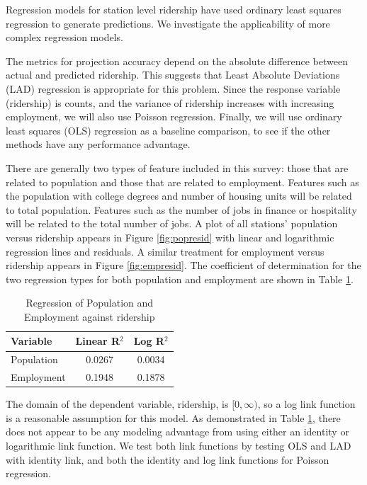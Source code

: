 \documentclass[11pt]{article}
\begin{document}
Regression models for station level ridership have used ordinary least squares regression \cite{Kuby2004, Taylor2008, Currie2011, Durning2015, Gutierrez2011} to generate predictions. We investigate the applicability of more complex regression models.

The metrics for projection accuracy depend on the absolute difference between actual and predicted ridership. This suggests that Least Absolute Deviations (LAD) regression is appropriate for this problem. Since the response variable (ridership) is counts, and the variance of ridership increases with increasing employment, we will also use Poisson regression. Finally, we will use ordinary least squares (OLS) regression as a baseline comparison, to see if the other methods have any performance advantage.


There are generally two types of feature included in this survey: those that are related to population and those that are related to employment. Features such as the population with college degrees and number of housing units will be related to total population. Features such as the number of jobs in finance or hospitality will be related to the total number of jobs. A plot of all stations' population versus ridership appears in Figure \ref{fig:popresid} with linear and logarithmic regression lines and residuals. A similar treatment for employment versus ridership appears in Figure \ref{fig:empresid}. The coefficient of determination for the two regression types for both population and employment are shown in Table \ref{tab:regr2}.

\begin{table}
\centering
\begin{tabular}{lcc}
\toprule Variable&Linear R$^2$&Log R$^2$ \\ 
\midrule Population&0.0267&0.0034 \\
Employment&0.1948&0.1878 \\
\bottomrule
\end{tabular}
\caption{Regression of Population and Employment against ridership}\label{tab:regr2}
\end{table}


The domain of the dependent variable, ridership, is $[0, \infty)$, so a log link function is a reasonable assumption for this model. As demonstrated in Table \ref{tab:regr2}, there does not appear to be any modeling advantage from using either an identity or logarithmic link function. We test both link functions by testing OLS and LAD with identity link, and both the identity and log link functions for Poisson regression.
\end{document}
